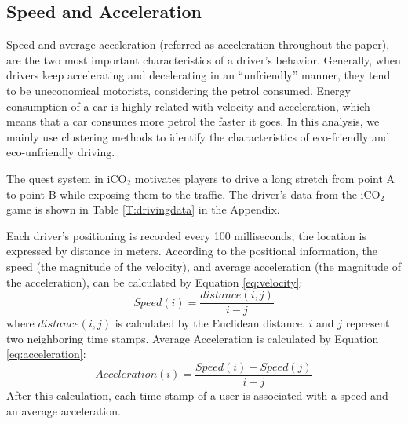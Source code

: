 \documentclass[preprint,authoryear,12pt]{elsarticle}
\begin{document}

\subsection{Speed and Acceleration}

Speed and average acceleration (referred as acceleration throughout the paper), are the two most important characteristics of a driver's behavior. Generally, when drivers keep accelerating and decelerating in an ``unfriendly'' manner, they tend to be uneconomical motorists, considering the petrol consumed. Energy consumption of a car is highly related with velocity and acceleration, which means that a car consumes more petrol the faster it goes. In this analysis, we mainly use clustering methods to identify the characteristics of eco-friendly and eco-unfriendly driving.


The quest system in iCO$_2$ motivates players to drive a long stretch from point A to point B while exposing them to the traffic. The driver's data from the iCO$_2$ game is shown in Table \ref{T:drivingdata} in the Appendix.


 Each driver's positioning is recorded every 100 milliseconds, the location is expressed by distance in meters. According to the positional information, the speed (the magnitude of the velocity), and average acceleration (the magnitude of the acceleration), can be calculated by Equation \ref{eq:velocity}:
\begin{equation}\label{eq:velocity}
Speed(i) = \frac{distance(i,j)}{i-j}
\end{equation}
where $distance(i,j)$ is calculated by the Euclidean distance. $i$ and $j$ represent two neighboring time stamps. Average Acceleration is calculated by Equation \ref{eq:acceleration}:
\begin{equation}\label{eq:acceleration}
Acceleration(i) = \frac{Speed(i) - Speed(j)}{i-j}
\end{equation}
After this calculation, each time stamp of a user is associated with a speed and an average acceleration.
\end{document}
